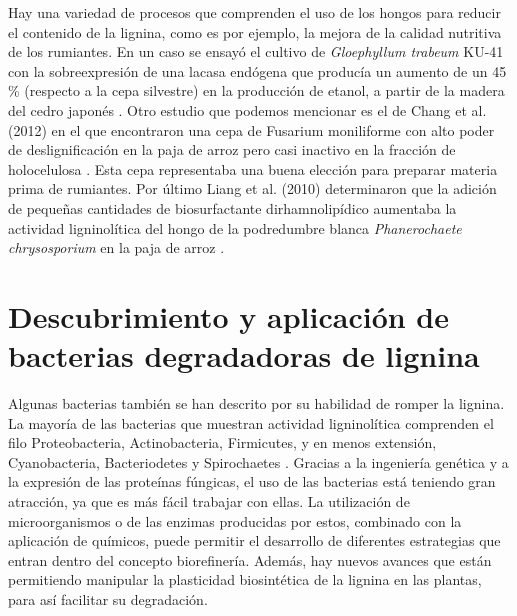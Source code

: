 \documentclass[final,a4paper,times,3p,onecolumn]{elsarticle}
\begin{document}
Hay una variedad de procesos que comprenden el uso de los hongos para reducir el contenido de la lignina, como es por ejemplo, la mejora de la calidad nutritiva de los rumiantes. En un caso se ensayó el cultivo de \textit{Gloephyllum trabeum} KU-41 con la sobreexpresión de una lacasa endógena que producía un aumento de un 45 \% (respecto a la cepa silvestre) en la producción de etanol, a partir de la madera del cedro japonés \cite{Arimoto2015}. Otro estudio que podemos mencionar es el de Chang et al. (2012) en el que encontraron una cepa de Fusarium moniliforme con alto poder de deslignificación en la paja de arroz pero casi inactivo en la fracción de holocelulosa \cite{Chang2012}. Esta cepa representaba una buena elección para preparar materia prima de rumiantes. Por último Liang et al. (2010) determinaron que la adición de pequeñas cantidades de biosurfactante dirhamnolipídico aumentaba la actividad ligninolítica del hongo de la podredumbre blanca \textit{Phanerochaete chrysosporium} en la paja de arroz \cite{Liang2010}.

\section{Descubrimiento y aplicación de bacterias degradadoras de lignina}
Algunas bacterias también se han descrito por su habilidad de romper la lignina. La mayoría de las bacterias que muestran actividad ligninolítica comprenden el filo Proteobacteria, Actinobacteria, Firmicutes, y en menos extensión, Cyanobacteria, Bacteriodetes y Spirochaetes \cite{Tian2014}. Gracias a la ingeniería genética y a la expresión de las proteínas fúngicas, el uso de las bacterias está teniendo gran atracción, ya que es más fácil trabajar con ellas. La utilización de microorganismos o de las enzimas producidas por estos, combinado con la aplicación de químicos, puede permitir el desarrollo de diferentes estrategias que entran dentro del concepto biorefinería. Además, hay nuevos avances que están permitiendo manipular la plasticidad biosintética de la lignina en las plantas, para así facilitar su degradación.
\end{document}
